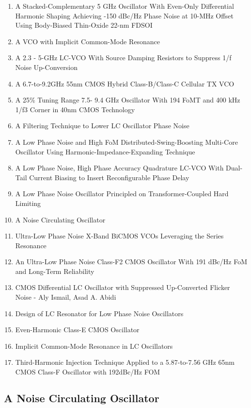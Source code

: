 \documentclass{article}
\begin{document}
\begin{enumerate}
	\item A Stacked-Complementary 5 GHz Oscillator With Even-Only Differential Harmonic Shaping Achieving -150 dBc/Hz Phase Noise at 10-MHz Offset Using Body-Biased Thin-Oxide 22-nm FDSOI
	\item A VCO with Implicit Common-Mode Resonance
	\item A 2.3 - 5-GHz LC-VCO With Source Damping Resistors to Suppress 1/f Noise Up-Conversion
	\item A 6.7-to-9.2GHz 55nm CMOS Hybrid Class-B/Class-C Cellular TX VCO
	\item A 25\% Tuning Range 7.5- 9.4 GHz Oscillator With 194 FoMT and 400 kHz 1/f3 Corner in 40nm CMOS Technology
	\item A Filtering Technique to Lower LC Oscillator Phase Noise
	\item A Low Phase Noise and High FoM Distributed-Swing-Boosting Multi-Core Oscillator Using Harmonic-Impedance-Expanding Technique
	\item A Low Phase Noise, High Phase Accuracy Quadrature LC-VCO With Dual-Tail Current Biasing to Insert Reconfigurable Phase Delay
	\item A Low Phase Noise Oscillator Principled on Transformer-Coupled Hard Limiting
	\item A Noise Circulating Oscillator
	\item Ultra-Low Phase Noise X-Band BiCMOS VCOs Leveraging the Series Resonance
	\item An Ultra-Low Phase Noise Class-F2 CMOS Oscillator With 191 dBc/Hz FoM and Long-Term Reliability
	\item CMOS Differential LC Oscillator with Suppressed Up-Converted Flicker Noise - Aly Ismail, Asad A. Abidi
	\item Design of LC Resonator for Low Phase Noise Oscillators
	\item Even-Harmonic Class-E CMOS Oscillator
	\item Implicit Common-Mode Resonance in LC Oscillators
	\item Third-Harmonic Injection Technique Applied to a 5.87-to-7.56 GHz 65nm CMOS Class-F Oscillator with 192dBc/Hz FOM
\end{enumerate}


\subsection{A Noise Circulating Oscillator}
\end{document}
